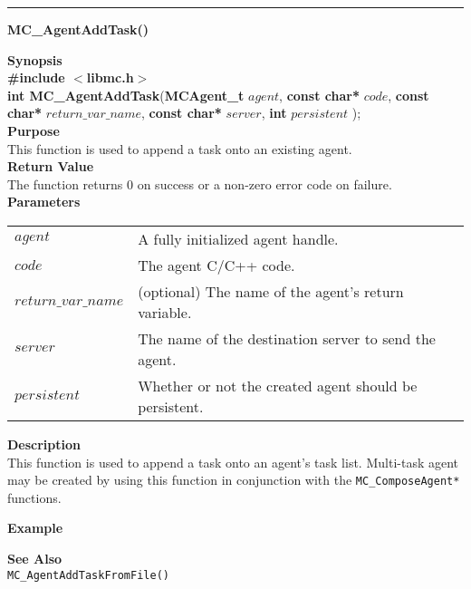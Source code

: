 \noindent
\vspace{5pt}
\rule{6.5in}{0.015in}
\noindent
{}
{\LARGE \bf MC\_AgentAddTask()}\\

\noindent
{\bf Synopsis}\\
{\bf \#include $<$libmc.h$>$}\\
{\bf int MC\_AgentAddTask}({\bf MCAgent\_t} $agent$, 
                                  {\bf const char*} $code$,
                                  {\bf const char*} $return\_var\_name$,
                                  {\bf const char*} $server$,
                                  {\bf int} $persistent$
																	);\\

\noindent
{\bf Purpose}\\
This function is used to append a task onto an existing agent.\\

\noindent
{\bf Return Value}\\
The function returns 0 on success or a non-zero error code on failure.\\

\noindent
{\bf Parameters}
\vspace{-0.1in}
\begin{description}
\item
\begin{tabular}{p{30 mm}p{125 mm}} 
$agent$ & A fully initialized agent handle.\\
$code$ & The agent C/C++ code.\\
$return\_var\_name$ & (optional) The name of the agent's return variable.\\
$server$ & The name of the destination server to send the agent.\\
$persistent$ & Whether or not the created agent should be persistent.\\
\end{tabular}
\end{description}

\noindent
{\bf Description}\\
This function is used to append a task onto an agent's task list. Multi-task
agent may be created by using this function in conjunction with the
\texttt{MC\_ComposeAgent*} functions.

\noindent
{\bf Example}\\
\noindent
{\footnotesize}

\noindent
{\bf See Also}\\
\texttt{MC\_AgentAddTaskFromFile()}

